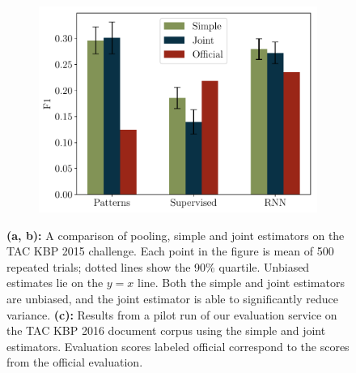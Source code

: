 \begin{figure}[t]
\begin{subfigure}{0.30\textwidth}
    \includegraphics[width=\columnwidth]{figures/kbp2016/kbp2016_f1}
    \caption{\label{fig:evaluation-results}}
  \end{subfigure}

  \caption{\label{fig:simulation}
  \textbf{(a, b):}
  A comparison of pooling, simple and joint estimators on the TAC KBP 2015 challenge.
  Each point in the figure is mean of 500 repeated trials; dotted lines show the 90\% quartile.
  Unbiased estimates lie on the $y = x$ line.
  Both the simple and joint estimators are unbiased, and the joint estimator is able to significantly reduce variance.
  \textbf{(c):} 
  Results from a pilot run of our evaluation service on the TAC KBP 2016 document corpus using the simple and joint estimators.
  Evaluation scores labeled official correspond to the scores from the official evaluation.
  }


\end{figure}

